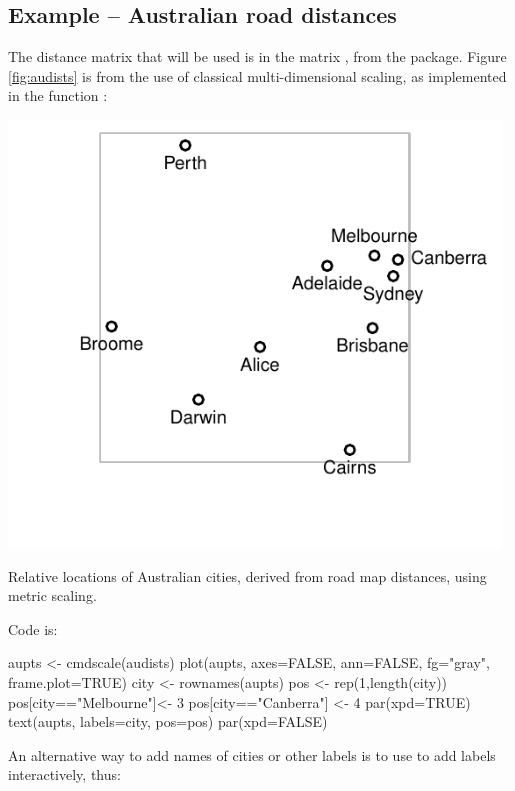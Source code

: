 \subsection*{Example -- Australian road distances}
The distance matrix that will be used is in the matrix ,
from the  package.  Figure \ref{fig:audists} is from the
use of classical multi-dimensional scaling, as implemented in the
function :
\begin{marginfigure}
\begin{Schunk}


\centerline{\includegraphics[width=0.98\textwidth]{figs/12-aupoints-1} }

\end{Schunk}
\caption{Relative locations of Australian cities, derived from road
  map distances, using metric scaling.\label{fig:audists}}
\end{marginfigure}
Code is:
\begin{Schunk}
\begin{Sinput}
aupts <- cmdscale(audists)
plot(aupts, axes=FALSE, ann=FALSE, fg="gray",
     frame.plot=TRUE)
city <- rownames(aupts)
pos <- rep(1,length(city))
pos[city=="Melbourne"]<- 3
pos[city=="Canberra"] <- 4
par(xpd=TRUE)
text(aupts, labels=city, pos=pos)
par(xpd=FALSE)
\end{Sinput}
\end{Schunk}

\noindent
An alternative way to add names of cities or other labels is to use
 to add labels interactively, thus:


